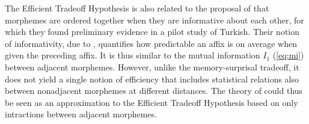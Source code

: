 \documentclass[man]{apa7}
\newcommand{\citep}{\parencite}
\newcommand{\citet}{\Textcite}
\newcommand\mhahn[1]{{\color{red}(#1)}}
\begin{document}

The Efficient Tradeoff Hypothesis is also related to the proposal of \citet{inkelas2016affix} that morphemes are ordered together when they are informative about each other, for which they found preliminary evidence in a pilot study of Turkish.
Their notion of informativity, due to \citep{priva2017informativity}, quantifies how predictable an affix is on average when given the preceding affix.
It is thus similar to the mutual information $I_1$ (\ref{eq:mi}) between adjacent morphemes.
However, unlike the memory-surprisal tradeoff, it does not yield a single notion of efficiency that includes statistical relations also between nonadjacent morphemes at different distances.
The theory of \citet{inkelas2016affix} could thus be seen as an approximation to the Efficient Tradeoff Hypothesis based on only intractions between adjacent morphemes.

\end{document}
